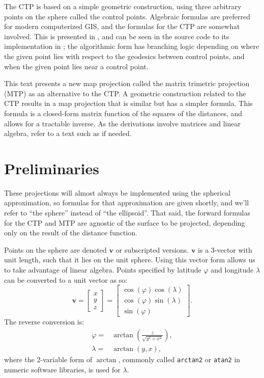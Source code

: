 \documentclass[]{interact}
\begin{document}
The CTP is based on a simple geometric construction, using three arbitrary
points on the sphere called the control points. Algebraic formulas are preferred
for modern computerized GIS, and the formulas for the CTP are somewhat involved.
This is presented in \citet{christensen}, and can be seen in the source code to
its implementation in \citet{proj}; the algorithmic form has branching logic
depending on where the given point lies with respect to the geodesics between
control points, and when the given point lies near a control point.

This text presents a new map projection called the matrix trimetric projection
(MTP) as an alternative to the CTP. A geometric construction related to the
CTP results in a map projection that is similar but has a simpler formula. This
formula is a closed-form matrix function of the squares of the distances, and
allows for a tractable inverse. As the derivations involve matrices and linear
algebra, refer to a text such as \citet{strang80} if needed.

\section{Preliminaries}
These projections will almost always be implemented using the spherical
approximation, so formulas for that approximation are given shortly, and we'll
refer to ``the sphere'' instead of ``the ellipsoid''. That said, the forward
formulas for the CTP and MTP are agnostic of the surface to be projected,
depending only on the result of the distance function.

Points on the sphere are denoted $\mathbf v$ or subscripted versions.
$\mathbf v$ is a 3-vector with unit length, such that it lies on the unit
sphere. Using this vector form allows us to take advantage of linear algebra.
Points specified by latitude $\varphi$ and longitude $\lambda$
can be converted to a unit vector as so:\citep{kent}
\begin{equation}
\mathbf v =
\begin{bmatrix*}
  x \\ y \\ z
\end{bmatrix*}
=
\begin{bmatrix*}
 \cos(\varphi) \cos(\lambda) \\
 \cos(\varphi) \sin(\lambda) \\
 \sin(\varphi)
\end{bmatrix*}.
\end{equation}
The reverse conversion is:
\begin{equation}\begin{split}
  \varphi =& \arctan\left(\frac{z}{\sqrt{y^2 + x^2}}\right), \\
  \lambda =& \arctan\left(y, x\right),
\end{split}\end{equation}
where the 2-variable form of $\arctan$, commonly called \texttt{arctan2} or
\texttt{atan2} in numeric software libraries, is used for $\lambda$.
\end{document}
